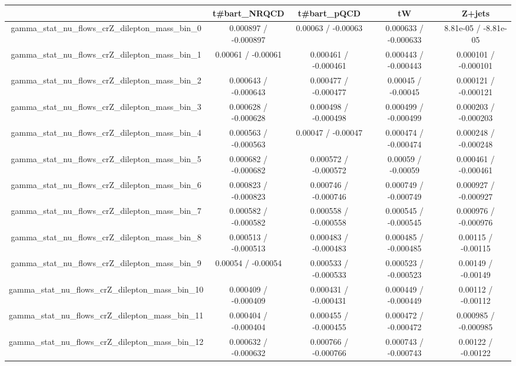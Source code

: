 \documentclass[10pt]{article}
\begin{document}
\begin{table}[htbp]
\begin{center}
\begin{tabular}{|c|c|c|c|c|}
\hline 
      & t#bar{t}_{NRQCD}      & t#bar{t}_{pQCD}      & tW      & Z+jets \\ 
\hline 
  gamma_stat_nu_flows_crZ_dilepton_mass_bin_0 & 0.000897 / -0.000897 & 0.00063 / -0.00063 & 0.000633 / -0.000633 & 8.81e-05 / -8.81e-05 \\ 
  gamma_stat_nu_flows_crZ_dilepton_mass_bin_1 & 0.00061 / -0.00061 & 0.000461 / -0.000461 & 0.000443 / -0.000443 & 0.000101 / -0.000101 \\ 
  gamma_stat_nu_flows_crZ_dilepton_mass_bin_2 & 0.000643 / -0.000643 & 0.000477 / -0.000477 & 0.00045 / -0.00045 & 0.000121 / -0.000121 \\ 
  gamma_stat_nu_flows_crZ_dilepton_mass_bin_3 & 0.000628 / -0.000628 & 0.000498 / -0.000498 & 0.000499 / -0.000499 & 0.000203 / -0.000203 \\ 
  gamma_stat_nu_flows_crZ_dilepton_mass_bin_4 & 0.000563 / -0.000563 & 0.00047 / -0.00047 & 0.000474 / -0.000474 & 0.000248 / -0.000248 \\ 
  gamma_stat_nu_flows_crZ_dilepton_mass_bin_5 & 0.000682 / -0.000682 & 0.000572 / -0.000572 & 0.00059 / -0.00059 & 0.000461 / -0.000461 \\ 
  gamma_stat_nu_flows_crZ_dilepton_mass_bin_6 & 0.000823 / -0.000823 & 0.000746 / -0.000746 & 0.000749 / -0.000749 & 0.000927 / -0.000927 \\ 
  gamma_stat_nu_flows_crZ_dilepton_mass_bin_7 & 0.000582 / -0.000582 & 0.000558 / -0.000558 & 0.000545 / -0.000545 & 0.000976 / -0.000976 \\ 
  gamma_stat_nu_flows_crZ_dilepton_mass_bin_8 & 0.000513 / -0.000513 & 0.000483 / -0.000483 & 0.000485 / -0.000485 & 0.00115 / -0.00115 \\ 
  gamma_stat_nu_flows_crZ_dilepton_mass_bin_9 & 0.00054 / -0.00054 & 0.000533 / -0.000533 & 0.000523 / -0.000523 & 0.00149 / -0.00149 \\ 
  gamma_stat_nu_flows_crZ_dilepton_mass_bin_10 & 0.000409 / -0.000409 & 0.000431 / -0.000431 & 0.000449 / -0.000449 & 0.00112 / -0.00112 \\ 
  gamma_stat_nu_flows_crZ_dilepton_mass_bin_11 & 0.000404 / -0.000404 & 0.000455 / -0.000455 & 0.000472 / -0.000472 & 0.000985 / -0.000985 \\ 
  gamma_stat_nu_flows_crZ_dilepton_mass_bin_12 & 0.000632 / -0.000632 & 0.000766 / -0.000766 & 0.000743 / -0.000743 & 0.00122 / -0.00122 \\ 

\end{tabular}
\end{center}
\end{table}
\end{document}
